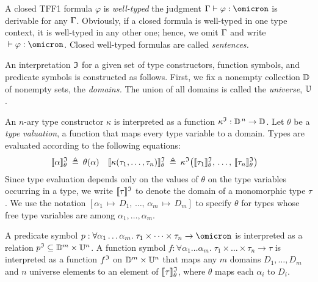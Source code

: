 A closed TFF1 formula $\varphi$ is {\em well-typed\/} \iff{}
the judgment $\GAM \vdash \varphi \ty \omicron$ is derivable
for any $\mathrm{\Gamma}$.
Obviously, if a closed formula is
well-typed in one type context, it is well-typed in any other one;
hence, we omit $\mathrm{\Gamma}$ and write
${} \vdash \varphi \ty \omicron$.
Closed well-typed formulas are called {\em sentences.}

An interpretation $\mathfrak{I}$ for a given set of type constructors,
function symbols, and predicate symbols is constructed as follows.
First, we fix a nonempty collection $\mathbb{D}$ of
nonempty sets, the {\em domains.} The union of all domains is called the
{\em universe}, %
$\mathbb{U}$.

An $n$-ary type constructor $\kappa$ is interpreted as a function
$\kappa^{\mathfrak{I}} : \mathbb{D}^{\,n} \to \mathbb{D}$.
Let $\theta$ be a {\em type valuation}, a function that maps every
type variable to a domain. Types are evaluated according to the following
equations:
\begin{align*}
\llbracket\alpha\rrbracket^{\mathfrak{I}}_{\theta} &\:\triangleq\: \theta(\alpha) &
\llbracket\kappa(\tau_1,\dots,\tau_n)\rrbracket^{\mathfrak{I}}_{\theta} &\:\triangleq\: \kappa^{\mathfrak{I}}\bigl(\llbracket\tau_1\rrbracket^{\mathfrak{I}}_{\theta},\,\dots,\,\llbracket\tau_n\rrbracket^{\mathfrak{I}}_{\theta}\bigr)
\end{align*}
Since type evaluation depends only on the values of $\theta$
on the type variables occurring in a type, we write $\llbracket\tau\rrbracket^{\mathfrak{I}}$
to denote the domain of a monomorphic type $\tau$.
We use the notation $[\alpha_1\,\mapsto\,D_1,\,\dots,\,\alpha_m\,\mapsto\,D_m]$
to specify $\theta$ for types whose free type variables are among
$\alpha_1,\dots,\alpha_m$.

A predicate symbol $p : \forall \alpha_1\dots\alpha_m .\; \tau_1 \times \dots \times \tau_n
\to \omicron$ is interpreted as a relation
$\smash{p^{\mathfrak{I}}} \subseteq \mathbb{D}^m \times \mathbb{U}^n$.
A function symbol $f : \forall \alpha_1\dots\alpha_m .\; \tau_1 \times \dots \times \tau_n \to \tau$
is interpreted as a function
$f^{\mathfrak{I}}$ on $\mathbb{D}^m \times \mathbb{U}^n$ that
maps any $m$ domains $D_1,\dots,D_m$ and
$n$ universe elements to an element of
$\llbracket\tau\rrbracket^{\mathfrak{I}}_\theta$, where $\theta$ maps each $\alpha_i$ to $D_i$.

